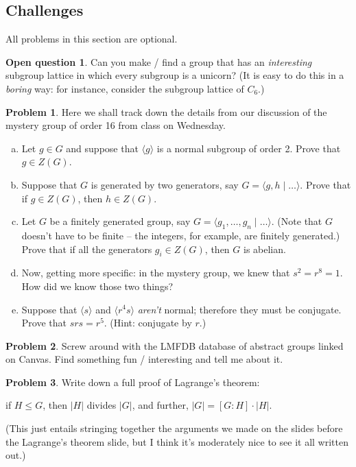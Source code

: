 \documentclass[12pt]{article}
\theoremstyle{definition} %
\newtheorem{problem}{Problem}
\def\<{\langle}
\def\>{\rangle}
\begin{document}
\pagebreak


\subsection*{Challenges}

All problems in this section are optional.

\newtheorem*{oq}{Open question}
\begin{oq}
    Can you make / find a group that has an \textit{interesting} subgroup lattice in which every subgroup is a unicorn? (It is easy to do this in a \textit{boring} way: for instance, consider the subgroup lattice of $C_6$.)
\end{oq}

\begin{problem} Here we shall track down the details from our discussion of the mystery group of order 16 from class on Wednesday.
    \begin{enumerate}[(a)]
        \item Let $g\in G$ and suppose that $\<g\>$ is a normal subgroup of order 2. Prove that $g\in Z(G)$.
        \item Suppose that $G$ is generated by two generators, say $G = \<g, h \mid \ldots \>$. Prove that if $g\in Z(G)$, then $h\in Z(G)$.
        \item Let $G$ be a finitely generated group, say $G = \<g_1, \ldots, g_n \mid \ldots\>$. (Note that $G$ doesn't have to be finite -- the integers, for example, are finitely generated.) Prove that if all the generators $g_i \in Z(G)$, then $G$ is abelian.
        \item Now, getting more specific: in the mystery group, we knew that $s^2 = r^8 = 1$. How did we know those two things?
        \item Suppose that $\<s\>$ and $\<r^4s\>$ \textit{aren't} normal; therefore they must be conjugate. Prove that $srs = r^5$. (Hint: conjugate by $r$.)
    \end{enumerate}
\end{problem}

\begin{problem}
    Screw around with the LMFDB database of abstract groups linked on Canvas. Find something fun / interesting and tell me about it.
\end{problem}

\begin{problem}
    Write down a full proof of Lagrange's theorem: 
    
    \begin{center}
        if $H\leq G$, then $|H|$ divides $|G|$, and further, $|G| = [G:H]\cdot |H|$.
    \end{center}
    
    (This just entails stringing together the arguments we made on the slides before the Lagrange's theorem slide, but I think it's moderately nice to see it all written out.)
\end{problem}
\end{document}

